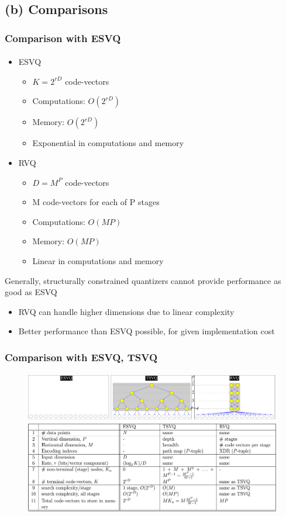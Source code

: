 \subsection{(b) Comparisons}
\begin{frame}
\frametitle{Comparison with ESVQ}\logoCSIPCPL\mypagenum
\framesubtitle{}
	\begin{itemize}
		\item ESVQ
			\begin{itemize}
				\item $K=2^{rD}$ code-vectors
				\item Computations: $O(2^{rD})$
				\item Memory: $O(2^{rD})$
				\item Exponential in computations and memory
			\end{itemize}
		\item RVQ
			\begin{itemize}
				\item $D={M^P}$ code-vectors
				\item M code-vectors for each of P stages
				\item Computations: $O(MP)$
				\item Memory: $O(MP)$
				\item Linear in computations and memory
			\end{itemize}
	\end{itemize}
	Generally, structurally constrained quantizers cannot provide performance as good as ESVQ
	\begin{itemize}
		\item RVQ can handle higher dimensions due to linear complexity
		\item Better performance than ESVQ possible, for given implementation cost
	\end{itemize}	
\end{frame}

\begin{frame}[plain]
\frametitle{Comparison with ESVQ, TSVQ}
\framesubtitle{}
\logoCSIPCPL\mypagenum
\begin{changemargin}{-1.3in}{0in}
\begin{figure}		
\includegraphics[width=1.3\textwidth]{thesis/RVQ_comparisonWithESVQ_TSVQ.pdf}			
\end{figure}
\end{changemargin}
\end{frame}




